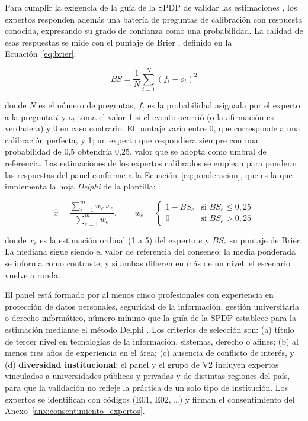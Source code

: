 Para cumplir la exigencia de la guía de la SPDP de validar las estimaciones \cite{spdp2026guiav2}, los expertos responden además una batería de preguntas de calibración con respuesta conocida, expresando su grado de confianza como una probabilidad. La calidad de esas respuestas se mide con el puntaje de Brier \cite{brier1950verification}, definido en la Ecuación~\ref{eq:brier}:

\begin{equation}
\label{eq:brier}
BS = \frac{1}{N} \sum_{t=1}^{N} \left( f_t - o_t \right)^2
\end{equation}

\noindent donde $N$ es el número de preguntas, $f_t$ es la probabilidad asignada por el experto a la pregunta $t$ y $o_t$ toma el valor 1 si el evento ocurrió (o la afirmación es verdadera) y 0 en caso contrario. El puntaje varía entre 0, que corresponde a una calibración perfecta, y 1; un experto que respondiera siempre con una probabilidad de 0,5 obtendría 0,25, valor que se adopta como umbral de referencia. Las estimaciones de los expertos calibrados se emplean para ponderar las respuestas del panel conforme a la Ecuación~\ref{eq:ponderacion}, que es la que implementa la hoja \textit{Delphi} de la plantilla:

\begin{equation}
\label{eq:ponderacion}
\hat{x} = \frac{\sum_{e=1}^{m} w_e\, x_e}{\sum_{e=1}^{m} w_e}, \qquad
w_e = \begin{cases} 1 - BS_e & \text{si } BS_e \le 0{,}25 \\ 0 & \text{si } BS_e > 0{,}25 \end{cases}
\end{equation}

\noindent donde $x_e$ es la estimación ordinal (1 a 5) del experto $e$ y $BS_e$ su puntaje de Brier. La mediana sigue siendo el valor de referencia del consenso; la media ponderada se informa como contraste, y si ambas difieren en más de un nivel, el escenario vuelve a ronda.


El panel está formado por al menos cinco profesionales con experiencia en protección de datos personales, seguridad de la información, gestión universitaria o derecho informático, número mínimo que la guía de la SPDP establece para la estimación mediante el método Delphi \cite{spdp2026guiav2}. Los criterios de selección son: (a) título de tercer nivel en tecnologías de la información, sistemas, derecho o afines; (b) al menos tres años de experiencia en el área; (c) ausencia de conflicto de interés, y (d) \textbf{diversidad institucional}: el panel y el grupo de V2 incluyen expertos vinculados a universidades públicas y privadas y de distintas regiones del país, para que la validación no refleje la práctica de un solo tipo de institución. Los expertos se identifican con códigos (E01, E02, \ldots) y firman el consentimiento del Anexo~\ref{anx:consentimiento_expertos}.

